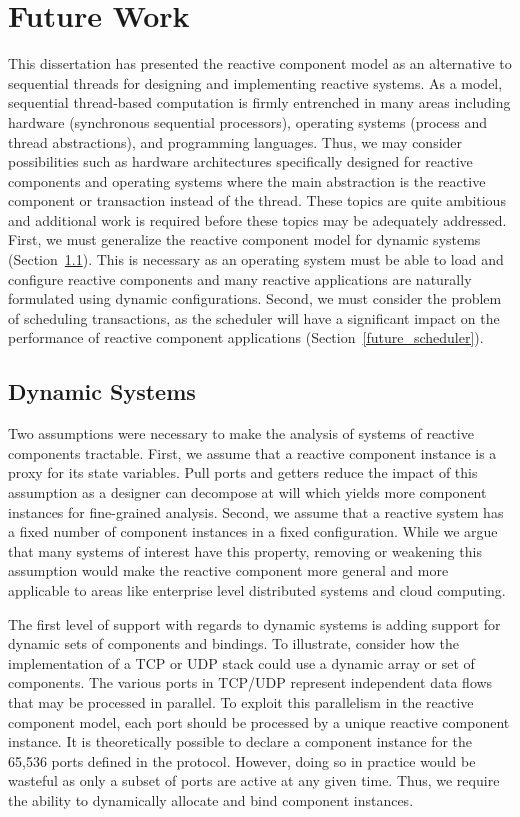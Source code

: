 \section{Future Work}

This dissertation has presented the reactive component model as an alternative to sequential threads for designing and implementing reactive systems.
As a model, sequential thread-based computation is firmly entrenched in many areas including hardware (synchronous sequential processors), operating systems (process and thread abstractions), and programming languages.
Thus, we may consider possibilities such as hardware architectures specifically designed for reactive components and operating systems where the main abstraction is the reactive component or transaction instead of the thread.
These topics are quite ambitious and additional work is required before these topics may be adequately addressed.
First, we must generalize the reactive component model for dynamic systems (Section~\ref{dynamic_systems}).
This is necessary as an operating system must be able to load and configure reactive components and many reactive applications are naturally formulated using dynamic configurations.
Second, we must consider the problem of scheduling transactions, as the scheduler will have a significant impact on the performance of reactive component applications (Section~\ref{future_scheduler}).

\subsection{Dynamic Systems}
\label{dynamic_systems}
Two assumptions were necessary to make the analysis of systems of reactive components tractable.
First, we assume that a reactive component instance is a proxy for its state variables.
Pull ports and getters reduce the impact of this assumption as a designer can decompose at will which yields more component instances for fine-grained analysis.
Second, we assume that a reactive system has a fixed number of component instances in a fixed configuration.
While we argue that many systems of interest have this property, removing or weakening this assumption would make the reactive component more general and more applicable to areas like enterprise level distributed systems and cloud computing.

The first level of support with regards to dynamic systems is adding support for dynamic sets of components and bindings.
To illustrate, consider how the implementation of a TCP or UDP stack could use a dynamic array or set of components.
The various ports in TCP/UDP represent independent data flows that may be processed in parallel.
To exploit this parallelism in the reactive component model, each port should be processed by a unique reactive component instance.
It is theoretically possible to declare a component instance for the 65,536 ports defined in the protocol.
However, doing so in practice would be wasteful as only a subset of ports are active at any given time.
Thus, we require the ability to dynamically allocate and bind component instances.

